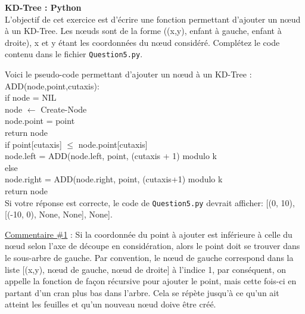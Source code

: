 \begin{Exercice}[15 minutes]\textbf{KD-Tree : Python}\\

L'objectif de cet exercice est d'écrire une fonction permettant d'ajouter un nœud à un KD-Tree. Les nœuds sont de la forme ((x,y), enfant à gauche, enfant à droite), x et y étant les coordonnées du nœud considéré. Complétez le code contenu dans le fichier \lstinline{Question5.py}.\\

\begin{conseil}
Voici le pseudo-code permettant d'ajouter un nœud à un KD-Tree :\\

ADD(node,point,cutaxis):\\
    \tabto{1cm}if node = NIL\\
        \tabto{2cm}node $\leftarrow$ Create-Node\\
        \tabto{2cm}node.point = point\\
        \tabto{2cm}return node\\
    \tabto{1cm}if point[cutaxis] $\leq$ node.point[cutaxis]\\
    \tabto{2cm} node.left = ADD(node.left, point, (cutaxis + 1) modulo k\\
    \tabto{1cm} else\\
    \tabto{2cm} node.right = ADD(node.right, point, (cutaxis+1) modulo k\\
    \tabto{1cm} return node\\
    
    Si votre réponse est correcte, le code de \lstinline{Question5.py} devrait afficher: [(0, 10), [(-10, 0), None, None], None].
\end{conseil}

\begin{solution}
    

    \underline{Commentaire \#1} : Si la coordonnée du point à ajouter est inférieure à celle du nœud selon l'axe de découpe en considération, alors le point doit se trouver dans le sous-arbre de gauche. Par convention, le nœud de gauche correspond dans la liste [(x,y), nœud de gauche, nœud de droite] à l'indice 1, par conséquent, on appelle la fonction de façon récursive pour ajouter le point, mais cette fois-ci en partant d'un cran plus bas dans l'arbre. Cela se répète jusqu'à ce qu'un ait atteint les feuilles et qu'un nouveau nœud doive être créé.

\end{solution}
\end{Exercice}

